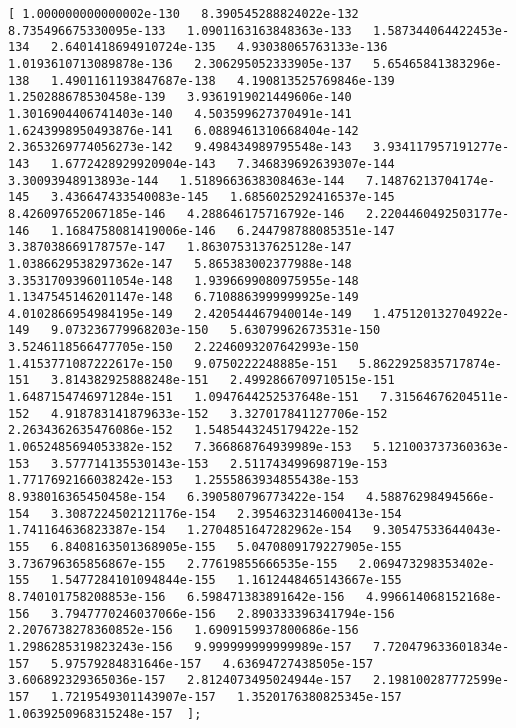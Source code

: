 \documentclass[11pt]{article}
\begin{document}
\begin{Verbatim}[commandchars=\\\{\}]
[ 1.000000000000002e-130   8.390545288824022e-132   8.735496675330095e-133   1.0901163163848363e-133   1.587344064422453e-134   2.6401418694910724e-135   4.93038065763133e-136   1.0193610713089878e-136   2.306295052333905e-137   5.65465841383296e-138   1.4901161193847687e-138   4.190813525769846e-139   1.250288678530458e-139   3.9361919021449606e-140   1.3016904406741403e-140   4.503599627370491e-141   1.6243998950493876e-141   6.0889461310668404e-142   2.3653269774056273e-142   9.498434989795548e-143   3.934117957191277e-143   1.6772428929920904e-143   7.346839692639307e-144   3.30093948913893e-144   1.5189663638308463e-144   7.14876213704174e-145   3.436647433540083e-145   1.6856025292416537e-145   8.426097652067185e-146   4.288646175716792e-146   2.2204460492503177e-146   1.1684758081419006e-146   6.244798788085351e-147   3.387038669178757e-147   1.8630753137625128e-147   1.0386629538297362e-147   5.865383002377988e-148   3.3531709396011054e-148   1.9396699080975955e-148   1.1347545146201147e-148   6.7108863999999925e-149   4.0102866954984195e-149   2.420544467940014e-149   1.475120132704922e-149   9.073236779968203e-150   5.63079962673531e-150   3.5246118566477705e-150   2.2246093207642993e-150   1.4153771087222617e-150   9.0750222248885e-151   5.8622925835717874e-151   3.814382925888248e-151   2.4992866709710515e-151   1.6487154746971284e-151   1.0947644252537648e-151   7.31564676204511e-152   4.918783141879633e-152   3.327017841127706e-152   2.2634362635476086e-152   1.5485443245179422e-152   1.0652485694053382e-152   7.366868764939989e-153   5.121003737360363e-153   3.577714135530143e-153   2.511743499698719e-153   1.7717692166038242e-153   1.2555863934855438e-153   8.938016365450458e-154   6.390580796773422e-154   4.58876298494566e-154   3.3087224502121176e-154   2.3954632314600413e-154   1.741164636823387e-154   1.2704851647282962e-154   9.30547533644043e-155   6.8408163501368905e-155   5.0470809179227905e-155   3.736796365856867e-155   2.77619855666535e-155   2.069473298353402e-155   1.5477284101094844e-155   1.1612448465143667e-155   8.740101758208853e-156   6.598471383891642e-156   4.996614068152168e-156   3.7947770246037066e-156   2.890333396341794e-156   2.2076738278360852e-156   1.6909159937800686e-156   1.2986285319823243e-156   9.999999999999989e-157   7.720479633601834e-157   5.97579284831646e-157   4.63694727438505e-157   3.606892329365036e-157   2.8124073495024944e-157   2.198100287772599e-157   1.7219549301143907e-157   1.3520176380825345e-157   1.0639250968315248e-157  ];

\end{Verbatim}
\end{document}
